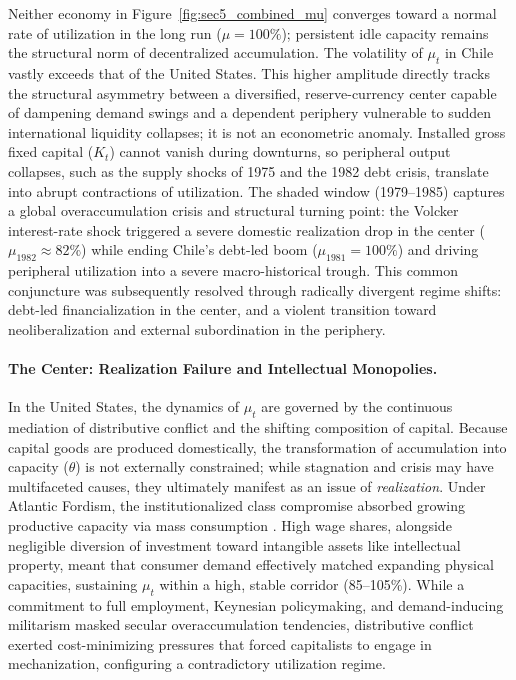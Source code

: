 Neither economy in Figure~\ref{fig:sec5_combined_mu} converges toward a normal rate of utilization in the long run ($\mu = 100\%$); persistent idle capacity remains the structural norm of decentralized accumulation. The volatility of $\mu_t$ in Chile vastly exceeds that of the United States. This higher amplitude directly tracks the structural asymmetry between a diversified, reserve-currency center capable of dampening demand swings and a dependent periphery vulnerable to sudden international liquidity collapses; it is not an econometric anomaly. Installed gross fixed capital ($K_t$) cannot vanish during downturns, so peripheral output collapses, such as the supply shocks of 1975 and the 1982 debt crisis, translate into abrupt contractions of utilization. The shaded window (1979--1985) captures a global overaccumulation crisis and structural turning point: the Volcker interest-rate shock triggered a severe domestic realization drop in the center ($\mu_{1982} \approx 82\%$) while ending Chile's debt-led boom ($\mu_{1981} = 100\%$) and driving peripheral utilization into a severe macro-historical trough. This common conjuncture was subsequently resolved through radically divergent regime shifts: debt-led financialization in the center, and a violent transition toward neoliberalization and external subordination in the periphery.

\paragraph{The Center: Realization Failure and Intellectual Monopolies.} 
In the United States, the dynamics of $\mu_t$ are governed by the continuous mediation of distributive conflict and the shifting composition of capital. Because capital goods are produced domestically, the transformation of accumulation into capacity ($\theta$) is not externally constrained; while stagnation and crisis may have multifaceted causes, they ultimately manifest as an issue of \textit{realization}. Under Atlantic Fordism, the institutionalized class compromise absorbed growing productive capacity via mass consumption \citep{Aglietta2000}. High wage shares, alongside negligible diversion of investment toward intangible assets like intellectual property, meant that consumer demand effectively matched expanding physical capacities, sustaining $\mu_t$ within a high, stable corridor (85--105\%). While a commitment to full employment, Keynesian policymaking, and demand-inducing militarism masked secular overaccumulation tendencies, distributive conflict exerted cost-minimizing pressures that forced capitalists to engage in mechanization, configuring a contradictory utilization regime. 

